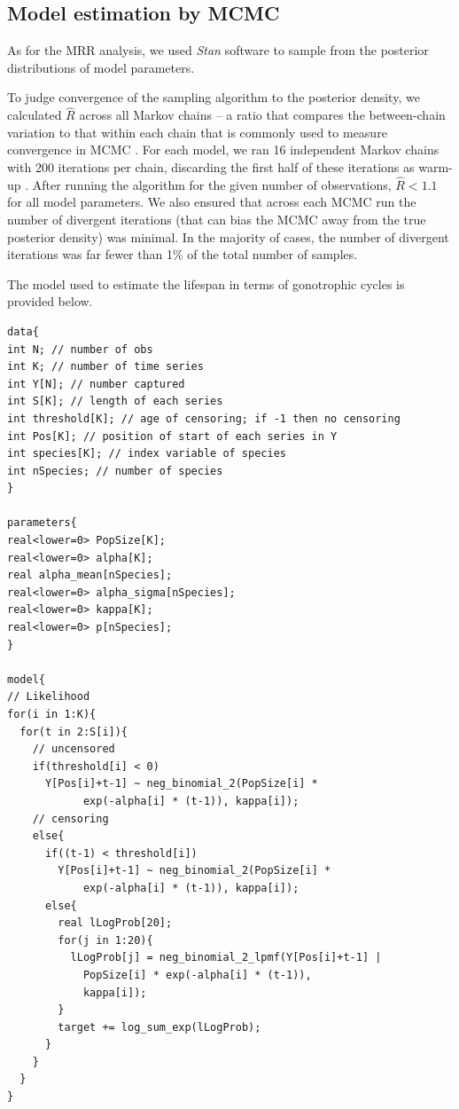 \documentclass[12pt]{article}
\begin{document}
{\subsection{Model estimation by MCMC}\label{sec:dissection_MCMC}
As for the MRR analysis, we used \textit{Stan} software \citep{carpenter2016stan} to sample from the posterior distributions of model parameters.

To judge convergence of the sampling algorithm to the posterior density, we calculated $\hat{R}$ across all Markov chains -- a ratio that compares the between-chain variation to that within each chain that is commonly used to measure convergence in MCMC \citep{gelman1992inference}. For each model, we ran 16 independent Markov chains with 200 iterations per chain, discarding the first half of these iterations as warm-up \citep{gelman2014bayesian}. After running the algorithm for the given number of observations, $\hat{R}<1.1$ for all model parameters. We also ensured that across each MCMC run the number of divergent iterations (that can bias the MCMC away from the true posterior density) was minimal. In the majority of cases, the number of divergent iterations was far fewer than 1\% of the total number of samples.

The model used to estimate the lifespan in terms of gonotrophic cycles is provided below.

\begin{verbatim}
data{
int N; // number of obs
int K; // number of time series
int Y[N]; // number captured
int S[K]; // length of each series
int threshold[K]; // age of censoring; if -1 then no censoring
int Pos[K]; // position of start of each series in Y
int species[K]; // index variable of species
int nSpecies; // number of species
}

parameters{
real<lower=0> PopSize[K];
real<lower=0> alpha[K];
real alpha_mean[nSpecies];
real<lower=0> alpha_sigma[nSpecies];
real<lower=0> kappa[K];
real<lower=0> p[nSpecies];
}

model{
// Likelihood
for(i in 1:K){
  for(t in 2:S[i]){
    // uncensored
    if(threshold[i] < 0)
      Y[Pos[i]+t-1] ~ neg_binomial_2(PopSize[i] *
			exp(-alpha[i] * (t-1)), kappa[i]);
    // censoring
    else{
      if((t-1) < threshold[i])
        Y[Pos[i]+t-1] ~ neg_binomial_2(PopSize[i] *
			exp(-alpha[i] * (t-1)), kappa[i]);
      else{
        real lLogProb[20];
        for(j in 1:20){
          lLogProb[j] = neg_binomial_2_lpmf(Y[Pos[i]+t-1] |
			PopSize[i] * exp(-alpha[i] * (t-1)),
			kappa[i]);
        }
        target += log_sum_exp(lLogProb);
      }
    }
  }  
}


\end{verbatim}}
\end{document}
